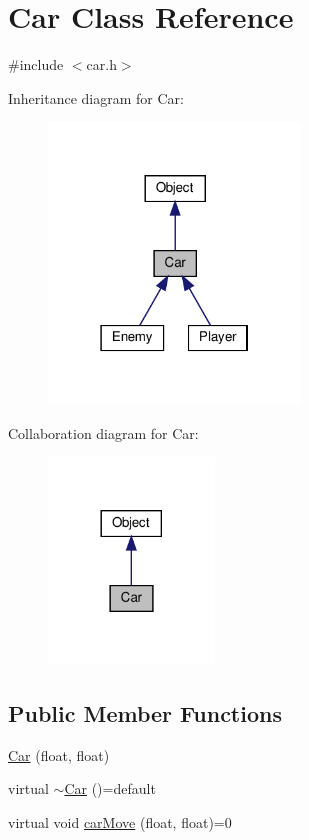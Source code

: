 \hypertarget{classCar}{}\section{Car Class Reference}
\label{classCar}


{\ttfamily \#include $<$car.\+h$>$}



Inheritance diagram for Car\+:\nopagebreak
\begin{figure}[H]
\begin{center}
\leavevmode
\includegraphics[width=190pt]{classCar__inherit__graph}
\end{center}
\end{figure}


Collaboration diagram for Car\+:\nopagebreak
\begin{figure}[H]
\begin{center}
\leavevmode
\includegraphics[width=125pt]{classCar__coll__graph}
\end{center}
\end{figure}
\subsection*{Public Member Functions}
\begin{DoxyCompactItemize}
\item 
\hyperlink{classCar_a1dd7bb5e39c21d7cc21fb5464dc6e397}{Car} (float, float)
\item 
virtual \hyperlink{classCar_a6d0e7bf36bd2588f9c119cf1b76d8e21}{$\sim$\+Car} ()=default
\item 
virtual void \hyperlink{classCar_a9650df764ceee00f738b888a7a976996}{car\+Move} (float, float)=0
\end{DoxyCompactItemize}
